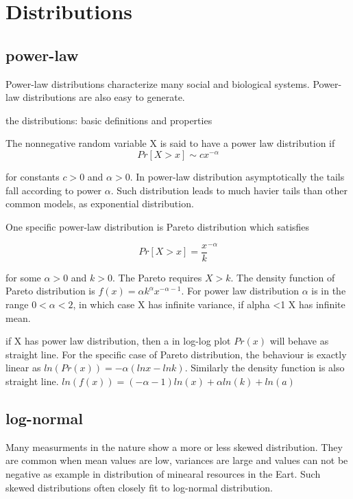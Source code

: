 

\section{Distributions}

\subsection{power-law}
Power-law distributions characterize many social and biological systems. Power-law distributions are also easy to generate. 

the distributions: basic definitions and properties

The nonnegative random variable X is said to have a power law distribution if 
\begin{equation}
Pr[X>x] \sim c x ^{-\alpha}
\end{equation}

for constants $c>0$ and $\alpha >0$. In power-law distribution asymptotically the tails fall according to power $\alpha$. Such distribution leads to much havier tails than other common models, as exponential distribution. 

One specific power-law distribution is Pareto distribution which satisfies 

\begin{equation}
	Pr[X>x] = \frac{x}{k} ^{-\alpha}
\end{equation}

for some $\alpha>0$ and $k>0$. The Pareto requires $X>k$. The density function of Pareto distribution is $f(x)=\alpha k^\alpha x^{-\alpha-1}$. For power law distribution $\alpha$ is in the range $0 < \alpha < 2$, in which case X has infinite variance, if alpha <1 X has infinite mean.

if X has power law distribution, then a in log-log plot $Pr(x)$ will behave as straight line. For the specific case of Pareto distribution, the behaviour is exactly linear as $ln (Pr(x)) = -\alpha (lnx -ln k) $. Similarly the density function is also straight line. $ln(f(x)) = (-\alpha - 1) ln (x) + \alpha ln (k) + ln(a)$

\subsection{log-normal}
Many measurments in the nature show a more or less skewed distribution. They are common when mean values are low, variances are large and values can not be negative as example in distribution of minearal resources in the Eart. Such skewed distributions often closely fit to log-normal distribution. 

